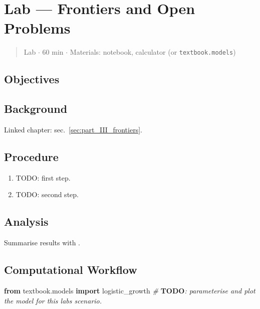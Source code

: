 \documentclass[
]{article}
\newenvironment{Shaded}{}{}
\newcommand{\AlertTok}[1]{\textcolor[rgb]{1.00,0.00,0.00}{\textbf{#1}}}
\newcommand{\CommentTok}[1]{\textcolor[rgb]{0.38,0.63,0.69}{\textit{#1}}}
\newcommand{\ImportTok}[1]{\textcolor[rgb]{0.00,0.50,0.00}{\textbf{#1}}}
\newcommand{\NormalTok}[1]{#1}
\theoremstyle{plain}
\theoremstyle{definition}
\begin{document}
\newpage

\section{Lab --- Frontiers and Open
Problems}\label{sec:lab_part_III_frontiers}

\begin{quote}
Lab \texorpdfstring{\ensuremath{\cdot}}{.} 60 min \texorpdfstring{\ensuremath{\cdot}}{.} Materials: notebook, calculator (or
\texttt{textbook.models})
\end{quote}

\subsection{Objectives}\label{objectives-11}

\subsection{Background}\label{background-11}

Linked chapter: sec.~\ref{sec:part_III_frontiers}.

\subsection{Procedure}\label{procedure-11}

\begin{enumerate}
\def\labelenumi{\arabic{enumi}.}
\item
  TODO: first step.
\item
  TODO: second step.
\end{enumerate}

\subsection{Analysis}\label{analysis-11}

Summarise results with .

\subsection{Computational Workflow}\label{computational-workflow-11}

\begin{Shaded}
\begin{Highlighting}[]
\ImportTok{from}\NormalTok{ textbook.models }\ImportTok{import}\NormalTok{ logistic\_growth}
\CommentTok{\# }\AlertTok{TODO}\CommentTok{: parameterise and plot the model for this lab\textquotesingle{}s scenario.}
\end{Highlighting}
\end{Shaded}
\end{document}

